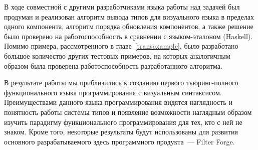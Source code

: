 \Conc
В ходе совместной с другими разработчиками языка работы над задачей был продуман и реализован алгоритм вывода типов для визуального языка в пределах одного компонента, алгоритм порядка обновления компонентов, а также решение было проверено на работоспособность в сравнении с языком-эталоном (Haskell). Помимо примера, рассмотренного в главе~\ref{transexample}, было разработано большое количество других тестовых примеров, на которых аналогичным образом была проверена работоспособность разработанного алгоритма. 

В результате работы мы приблизились к созданию первого тьюринг-полного функционального языка программирования с визуальным синтаксисом. Преимуществами данного языка программирования видятся наглядность и понятность работы системы типов и появление возможности наглядным образом изучить парадигму функционального программирования для тех, кто с ней не знаком. Кроме того, некоторые результаты будут использованы для развития основного разрабатываемого здесь программного продукта~--- Filter Forge.

\nocite{*}
\printbibliography[%
    heading=bibintoc%
]





